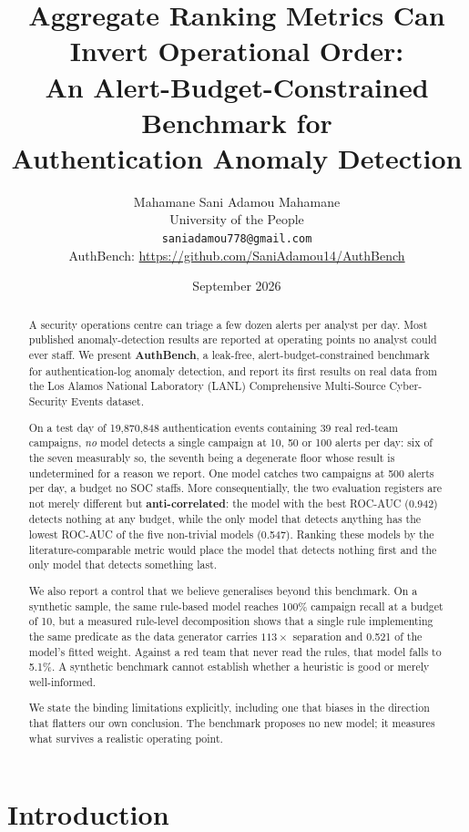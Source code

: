 \documentclass[11pt,a4paper]{article}
\title{Aggregate Ranking Metrics Can Invert Operational Order:\\
An Alert-Budget-Constrained Benchmark for\\
Authentication Anomaly Detection}
\author{Mahamane Sani Adamou Mahamane\\
\small University of the People\\
\small \texttt{saniadamou778@gmail.com}\\
\small AuthBench: \url{https://github.com/SaniAdamou14/AuthBench}}
\date{September 2026}
\begin{document}
\maketitle

\begin{abstract}
A security operations centre can triage a few dozen alerts per analyst per day.
Most published anomaly-detection results are reported at operating points no
analyst could ever staff. We present \textbf{AuthBench}, a leak-free,
alert-budget-constrained benchmark for authentication-log anomaly detection, and
report its first results on real data from the Los Alamos National Laboratory
(LANL) Comprehensive Multi-Source Cyber-Security Events dataset.

On a test day of 19{,}870{,}848 authentication events containing 39 real
red-team campaigns, \emph{no} model detects a single campaign at 10, 50 or 100
alerts per day: six of the seven measurably so, the seventh being a
degenerate floor whose result is undetermined for a reason we report. One model
catches two campaigns at 500 alerts per day, a budget no SOC staffs. More
consequentially, the two evaluation registers are not merely different but
\textbf{anti-correlated}: the model with
the best ROC-AUC (0.942) detects nothing at any budget, while the only model that
detects anything has the lowest ROC-AUC of the five non-trivial models (0.547).
Ranking these models by the literature-comparable metric would place the model
that detects nothing first and the only model that detects something last.

We also report a control that we believe generalises beyond this benchmark. On a
synthetic sample, the same rule-based model reaches 100\% campaign recall at a
budget of 10, but a measured rule-level decomposition shows that a single rule
implementing the same predicate as the data generator carries $113\times$
separation and 0.521 of the model's fitted weight. Against a red team that never
read the rules, that model falls to 5.1\%. A synthetic benchmark cannot establish
whether a heuristic is good or merely well-informed.

We state the binding limitations explicitly, including one that biases in the
direction that flatters our own conclusion. The benchmark proposes no new model;
it measures what survives a realistic operating point.
\end{abstract}

\section{Introduction}
\end{document}
